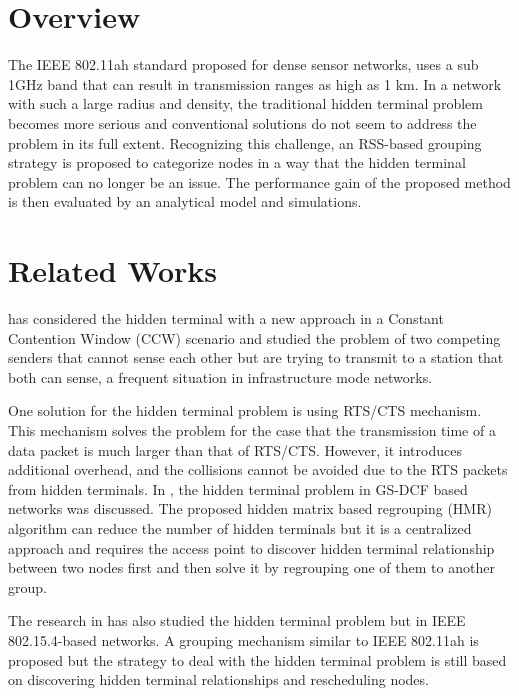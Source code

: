 \label{chapter:single}

\section{Overview}


The IEEE 802.11ah standard proposed for dense sensor networks, uses a sub 1GHz band that can result in transmission ranges as high as 1 km. In a network with such a large radius and density, the traditional hidden terminal problem becomes more serious and conventional solutions do not seem to address the problem in its full extent. Recognizing this challenge, an RSS-based grouping strategy is proposed to categorize nodes in a way that the hidden terminal problem can no longer be an issue. The performance gain of the proposed method is then evaluated by an analytical model and simulations.


\section{Related Works}

\cite{tsertou2008revisiting} has considered the hidden terminal with a new approach in a Constant Contention Window (CCW) scenario and studied the problem of two competing senders that cannot sense each other but are trying to transmit to a station that both can sense, a frequent situation in infrastructure mode networks.

One solution for the hidden terminal problem is using RTS/CTS mechanism. This mechanism solves the problem for the case that the transmission time of a data packet is much larger than that of RTS/CTS. However, it introduces additional overhead, and the collisions cannot be avoided due to the RTS packets from hidden terminals. In \cite{yoonregrouping}, the hidden terminal problem in GS-DCF based networks was discussed. The proposed hidden matrix based regrouping (HMR) algorithm can reduce the number of hidden terminals but it is a centralized approach and requires the access point to discover hidden terminal relationship between two nodes first and then solve it by regrouping one of them to another group.

The research in \cite{tseng2014effective} has also studied the hidden terminal problem but in IEEE 802.15.4-based networks. A grouping mechanism similar to IEEE 802.11ah is proposed but the strategy to deal with the hidden terminal problem is still based on discovering hidden terminal relationships and rescheduling nodes.

